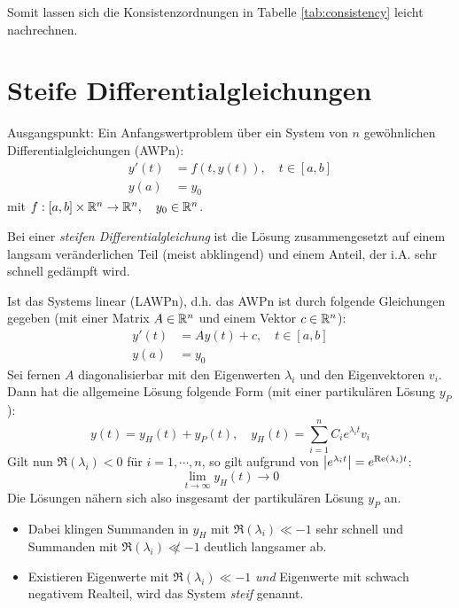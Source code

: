                 Somit lassen sich die Konsistenzordnungen in Tabelle \ref{tab:consistency} leicht nachrechnen.

    \section{Steife Differentialgleichungen}
        Ausgangspunkt: Ein Anfangswertproblem über ein System von \(n\) gewöhnlichen Differentialgleichungen (AWPn):
        \begin{align*}
        	y'(t) & = f(t, y(t)), \quad t \in [a, b] \\
        	y(a)  & = y_0
        \end{align*}
        mit \( f : [a, b] \times \mathbb{R}^n \rightarrow \mathbb{R}^n, \quad y_0 \in \mathbb{R}^n \).
        
        Bei einer \textit{steifen Differentialgleichung} ist die Lösung zusammengesetzt auf einem langsam veränderlichen Teil (meist abklingend) und einem Anteil, der i.A. sehr schnell gedämpft wird.
        
        Ist das Systems linear (LAWPn), d.h. das AWPn ist durch folgende Gleichungen gegeben (mit einer Matrix \( A \in \mathbb{R}^n \) und einem Vektor \( c \in \mathbb{R}^n \)):
        \begin{align*}
	        y'(t) & = Ay(t) + c, \quad t \in [a, b] \\
	        y(a) &= y_0
        \end{align*}
        Sei fernen \(A\) diagonalisierbar mit den Eigenwerten \(\lambda_i\) und den Eigenvektoren \(v_i\). Dann hat die allgemeine Lösung folgende Form (mit einer partikulären Lösung \(y_P\)):
        \begin{equation*}
	        y(t) = y_H(t) + y_P(t), \quad y_H(t) = \sum_{i=1}^{n} C_i e^{\lambda_i t} v_i
        \end{equation*}
        Gilt nun \( \Re(\lambda_i) < 0 \) für \( i = 1, \cdots, n \), so gilt aufgrund von \( \abs{e^{\lambda_i t}} = e^{\Re(\lambda_i)t} \):
        \begin{equation*}
	        \lim\limits_{t \rightarrow \infty} y_H(t) \rightarrow 0
        \end{equation*}
        Die Lösungen nähern sich also insgesamt der partikulären Lösung \( y_P \) an.
        \begin{itemize}
        	\item Dabei klingen Summanden in \(y_H\) mit \( \Re(\lambda_i) \ll -1 \) sehr schnell und Summanden mit \( \Re(\lambda_i) \not\ll -1 \) deutlich langsamer ab.
        	\item Existieren Eigenwerte mit \( \Re(\lambda_i) \ll -1 \) \textit{und} Eigenwerte mit schwach negativem Realteil, wird das System \textit{steif} genannt.
        \end{itemize}
    
